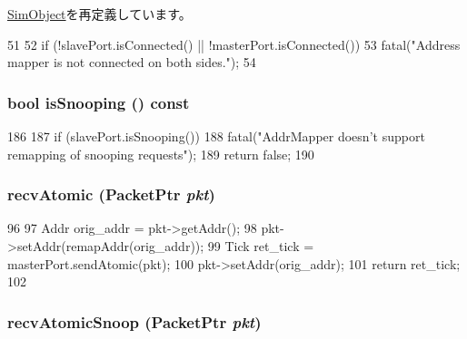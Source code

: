 \hyperlink{classSimObject_a02fd73d861ef2e4aabb38c0c9ff82947}{SimObject}を再定義しています。


\begin{DoxyCode}
51 {
52     if (!slavePort.isConnected() || !masterPort.isConnected())
53         fatal("Address mapper is not connected on both sides.\n");
54 }
\end{DoxyCode}
\hypertarget{classAddrMapper_a5ce11b7a254d3cb756d94568f7cbc25d}{
\subsubsection[{isSnooping}]{\setlength{\rightskip}{0pt plus 5cm}bool isSnooping () const}}
\label{classAddrMapper_a5ce11b7a254d3cb756d94568f7cbc25d}



\begin{DoxyCode}
186 {
187     if (slavePort.isSnooping())
188         fatal("AddrMapper doesn't support remapping of snooping requests\n");
189     return false;
190 }
\end{DoxyCode}
\hypertarget{classAddrMapper_a5f0b4c4a94f6b0053f9d7a4eb9c2518a}{
\subsubsection[{recvAtomic}]{ recvAtomic ({\bf PacketPtr} {\em pkt})}}
\label{classAddrMapper_a5f0b4c4a94f6b0053f9d7a4eb9c2518a}



\begin{DoxyCode}
96 {
97     Addr orig_addr = pkt->getAddr();
98     pkt->setAddr(remapAddr(orig_addr));
99     Tick ret_tick =  masterPort.sendAtomic(pkt);
100     pkt->setAddr(orig_addr);
101     return ret_tick;
102 }
\end{DoxyCode}
\hypertarget{classAddrMapper_a886d584c81ee4e398ff8069907f6e1a5}{
\subsubsection[{recvAtomicSnoop}]{ recvAtomicSnoop ({\bf PacketPtr} {\em pkt})}}
\label{classAddrMapper_a886d584c81ee4e398ff8069907f6e1a5}



